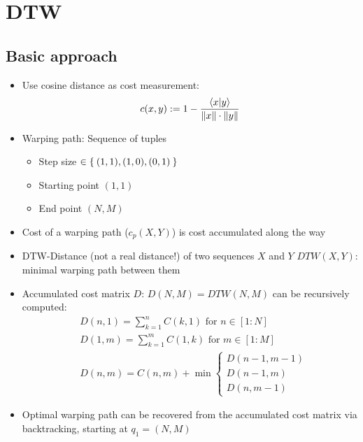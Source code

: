 \section{DTW}
\subsection{Basic approach}

\begin{itemize}
	\item
		Use cosine distance as cost measurement:
		\begin{equation}
			c(x,y) := 1 - \frac{\langle x | y \rangle}{\left \Vert x \right \Vert \cdot \left \Vert y \right \Vert}
		\end{equation}
	\item
		Warping path: Sequence of tuples
		\begin{itemize}
			\item
				Step size  $\in \Set{(1,1), (1,0), (0,1)}$
			\item
				Starting point $(1,1)$
			\item
				End point $(N,M)$
		\end{itemize}
	\item
		Cost of a warping path ($c_p(X,Y)$) is cost accumulated along the way
	\item
		DTW-Distance (not a real distance!) of two sequences $X$ and $Y$ $DTW(X,Y)$: minimal warping path between them
	\item
		Accumulated cost matrix $D$: $D(N,M) = DTW(N,M)$ can be recursively computed:
		\begin{align}
			&D(n,1) = \sum_{k=1}^n C(k,1) \text{ for } n \in [1 : N]\\
			&D(1,m) = \sum_{k=1}^m C(1,k) \text{ for } m \in [1 : M]\\
			&D(n,m) = C(n,m) + \min \begin{cases}
				D(n-1,m-1)\\
				D(n-1,m)\\
				D(n,m-1)
			\end{cases}
		\end{align}
	\item
		Optimal warping path can be recovered from the accumulated cost matrix via backtracking, starting at $q_1 = (N,M)$
\end{itemize}

